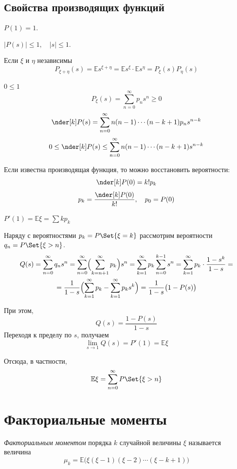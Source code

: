 \subsection{Свойства производящих функций}

\begin{props}
\item $ P(1) = 1 $.
\item $ |P(s)| \le 1, \quad |s| \le 1 $.
\item Если $ \xi $ и $ \eta $ независимы
    $$ P_{\xi + \eta}(s) = \mathbb Es^{\xi + \eta} =
    \mathbb E s^\xi \cdot \mathbb E s^\eta = P_\xi(s)P_\eta(s) $$
\item $ 0 \le 1 $
	$$ P_\xi(s) = \sum_{n = 0}^\infty p_ns^n \ge 0 $$
	$$ \nder[k]P(s) = \sum_{n = 0}^\infty n (n - 1) \cdots (n - k + 1)p_ns^{n - k} $$
	$$ 0 \le \nder[k]P(s) \le \sum_{n = 0}^\infty n(n - 1) \cdots (n - k + 1)s^{n - k} $$
\item Если известна производящая функция, то можно восстановить вероятности:
	$$ \nder[k]P(0) = k!p_k $$
	$$ p_k = \frac{\nder[k]P(0)}{k!}, \quad p_0 = P(0) $$
\item $ P'(1) = \mathbb E \xi = \sum k p_k $

	Наряду с вероятностями $ p_k = P\Set{\xi = k} $ рассмотрим вероятности $ q_n = P\Set{\xi > n} $.
	\begin{multline*}
		Q(s) = \sum_{n = 0}^\infty q_ns^n =
		\sum_{n = 0}^\infty \Bigl( \sum_{k = n + 1}^\infty p_k \Bigr) s^n =
		\sum_{k = 1}^\infty p_k \sum_{n = 0}^{k - 1}s^n =
		\sum_{k = 1}^\infty p_k \cdot \frac{1 - s^k}{1 - s} = \\
		= \frac1{1 - s} \Bigl( \sum_{k = 1}^\infty p_k - \sum_{k = 1}^\infty p_ks^k \Bigr) =
		\frac1{1 - s} \bigl( 1 - P(s) \bigr)
	\end{multline*}

	При этом,
	$$ Q(s) = \frac{1 - P(s)}{1 - s} $$
	Переходя к пределу по $ s $, получаем
	$$ \lim\limits_{s \to 1} Q(s) = P'(1) = \mathbb E \xi $$

	Отсюда, в частности,
	$$ \mathbb E \xi = \sum_{n = 0}^\infty P\Set{\xi > n} $$
\end{props}

\section{Факториальные моменты}

\begin{definition}
	\emph{Факториальным моментом} порядка $ k $ случайной величины $ \xi $ называется величина
	$$ \mu_k = \mathbb E \bigl( \xi (\xi - 1)(\xi - 2) \cdots (\xi - k + 1) \bigr) $$
\end{definition}

